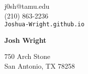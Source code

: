 \documentclass[12pt]{article}
\begin{document}
\noindent

\begin{minipage}{0.3\linewidth}
\begin{flushleft}
j0sh@tamu.edu\\
(210) 863-2236\\
\verb|Joshua-Wright.github.io|
\end{flushleft}
\end{minipage}
\hfill
\begin{minipage}{0.3\linewidth}
\begin{center}
{\Huge\textbf{Josh Wright}}
\end{center}
\end{minipage}
\hfill
\begin{minipage}{0.3\linewidth}
\begin{flushright}
750 Arch Stone\\
San Antonio, TX 78258
\end{flushright}
\end{minipage}
\vspace{-0.5em}
\end{document}
